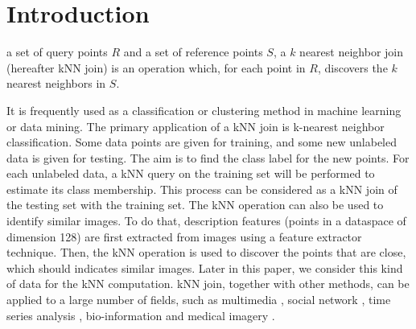 \section{Introduction}
 a set of query points $R$ and a set of reference points $S$, a $k$ nearest neighbor join 
(hereafter kNN join) is an operation which, for each point in $R$, discovers 
the $k$ nearest neighbors in $S$. 

It is frequently used as a classification or clustering method in machine learning or data mining. The primary 
application of a kNN join is k-nearest neighbor classification. Some data points are given for training, and some 
new unlabeled data is given for testing. The aim is to find the class label for the new points. For each unlabeled 
data, a kNN query on the training set will be performed to estimate its class membership. This process can be 
considered as a kNN join of the testing set with the training set. The kNN operation can also be used to identify
 similar images. To do that, description features (points in a dataspace of dimension 128) are first extracted from 
 images using a feature extractor technique. Then, the kNN operation is used to discover the points that are close, 
 which should indicates similar images. Later in this paper, we consider this kind of data for the kNN computation. kNN 
 join, together with other methods, can 
be applied to a large number of fields, such as multimedia 
\cite{knn_video_matting_iccv2013,Kriegel:1998:ASS:594718.594761}, social 
network \cite{Bai:2011:CPT:2043652.2043659}, time series analysis 
\cite{Rafiei:1997:SQT:253262.253264,Agrawal:1993:ESS:645415.652239}, bio-information and medical 
imagery \cite{5930107,Korn:1996:FNN:645922.673493}. 

